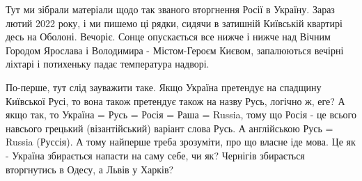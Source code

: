  
 
 
 
 

Тут ми зібрали матеріали щодо так званого вторгнення Росії в Україну. Зараз
лютий 2022 року, і ми пишемо ці рядки, сидячи в затишній Київській квартирі
десь на Оболоні. Вечоріє. Сонце опускається все нижче і нижче над Вічним
Городом Ярослава і Володимира - Містом-Героєм Києвом, запалюються вечірні
ліхтарі і потихеньку падає температура надворі.

По-перше, тут слід зауважити таке. Якщо Україна претендує на спадщину Київської
Русі, то вона також претендує також на назву Русь, логічно ж, еге? А якщо так,
то Україна = Русь = Росія = Раша = Russia, тому що Росія - це всього навсього
грецький (візантійський) варіант слова Русь. А англійською Русь = Russia
(Руссія). А тому найперше треба зрозуміти, про що власне іде мова. Це як -
Україна збирається напасти на саму себе, чи як?  Чернігів збирається
вторгнутись в Одесу, а Львів у Харків?
